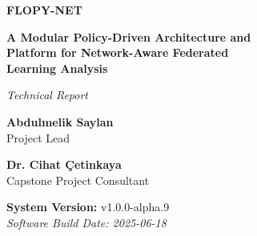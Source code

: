 \documentclass[12pt,twoside,a4paper]{article}
\begin{document}

\begin{titlepage}
\begin{center}
\vspace*{1cm}

{\Huge\bfseries\color{black} FLOPY-NET}

\vspace{1.5cm}

{\LARGE\bfseries A Modular Policy-Driven Architecture and\\ Platform for Network-Aware Federated\\[0.3cm] Learning Analysis}

\vspace{1.5cm}

{\large\textit{Technical Report}}

\vspace{2cm}


\vspace{2cm}

{\large\textbf{Abdulmelik Saylan}}\\
{\normalsize Project Lead}

\vspace{1cm}

{\large\textbf{Dr. Cihat Çetinkaya}}\\
{\normalsize Capstone Project Consultant}

\vspace{1cm}

{\large\textbf{System Version:} v1.0.0-alpha.9}\\
{\normalsize\textit{Software Build Date: 2025-06-18}}\\

\end{center}
\end{titlepage}
\end{document}
